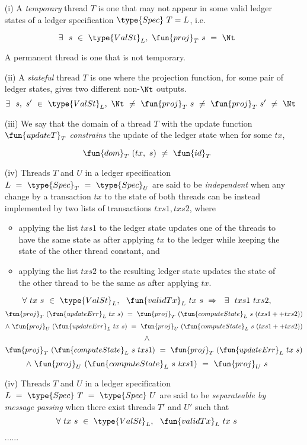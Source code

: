 \begin{itemize}
  \item[(i)] A \emph{temporary} thread $T$ is one that may not appear in some valid ledger
  states of a ledger specification $\type{Spec}~T = L$, i.e.

  \[ \exists~~s~\in~\type{ValSt}_L,~\fun{proj}_T~s~=~\Nt \]

  A permanent thread is one that is not temporary.

  \item[(ii)] A \emph{stateful} thread $T$ is one where the projection function,
  for some pair of ledger states, gives two different non-$\Nt$ outputs.
  \[ \exists~~s,~s'~\in~\type{ValSt}_L,~\Nt~\neq~\fun{proj}_T~s~\neq~\fun{proj}_T~s'~\neq~\Nt \]

  \item[(iii)] We say that the domain of a thread $T$ with the update function
  $\fun{updateT}_T$ \emph{constrains} the
  update of the ledger state when for some $tx$,

  \[ \fun{dom}_T~(tx,~s)~\neq~\fun{id}_T \]

  \item[(iv)] Threads $T$ and $U$ in a ledger specification $L~=~\type{Spec}_T~=~\type{Spec}_U$
  are said to be \emph{independent} when any change by a transaction $tx$ to the state of both threads can
  be instead implemented by two lists of transactions $txs1, txs2$, where

  \begin{itemize}
    \item applying the
    list $txs1$ to the ledger state updates one of the threads to have the same state as after applying
    $tx$ to the ledger while keeping the state of the other thread constant, and
    \item applying the list $txs2$ to the resulting ledger state updates the state of the
    other thread to be the same as after applying $tx$.
  \end{itemize}

  \[ \forall~tx~s~\in~\type{ValSt}_L,~~\fun{validTx}_L~tx~s~\Rightarrow~~\exists~~txs1~txs2, \]
  \[ \fun{proj}_{T}~(\fun{updateErr}_{L}~tx~s)~=~\fun{proj}_{T}~(\fun{computeState}_L~s~(txs1++txs2)) \]
  \[ \wedge~ \fun{proj}_{U}~(\fun{updateErr}_L~tx~s)~=~\fun{proj}_{U}~(\fun{computeState}_L~s~(txs1++txs2)) \]
  \[ \wedge \]
  \[ \fun{proj}_{T}~(\fun{computeState}_L~s~txs1)~=~\fun{proj}_{T}~(\fun{updateErr}_L~tx~s)  \]
  \[ \wedge~ \fun{proj}_{U}~(\fun{computeState}_L~s~txs1)~=~\fun{proj}_{U}~s \]

  \item[(iv)] Threads $T$ and $U$ in a ledger specification $L~=~\type{Spec}~T~=~\type{Spec}~U$
  are said to be \emph{separateable by message passing} when there exist threads $T'$ and $U'$
  such that
  \[ \forall~tx~s~\in~\type{ValSt}_L,~~\fun{validTx}_L~tx~s \]
  ......
\end{itemize}

